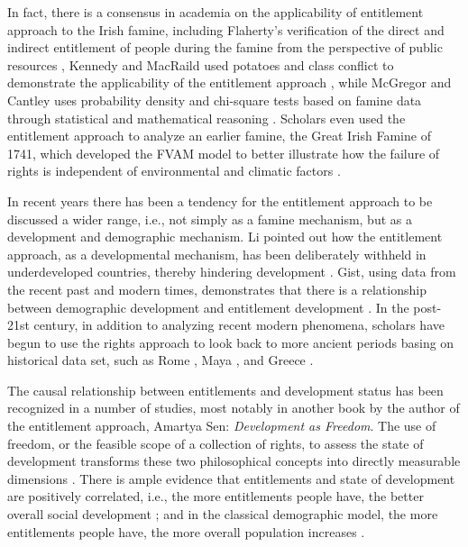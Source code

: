 In fact, there is a consensus in academia on the applicability of entitlement approach to the Irish famine, including Flaherty's verification of the direct and indirect entitlement of  people during the famine from the perspective of public resources \citep{flaherty2021common}, Kennedy and MacRaild used potatoes and class conflict to demonstrate the applicability of the entitlement approach \citep{kennedy2022perspectives}, while McGregor and Cantley uses probability density and chi-square tests based on famine data through statistical and mathematical reasoning \citep{mcgregor1992test}. Scholars even used the entitlement approach to analyze an earlier famine, the Great Irish Famine of 1741, which developed the FVAM model to better illustrate how the failure of rights is independent of environmental and climatic factors \citep{engler2013irish}. 

In recent years there has been a tendency for the entitlement approach to be discussed a wider range, i.e., not simply as a famine mechanism, but as a development and demographic mechanism. Li pointed out how the entitlement approach, as a developmental mechanism, has been deliberately withheld in underdeveloped countries, thereby hindering development \citep{li2017after}. Gist, using data from the recent past and modern times, demonstrates that there is a relationship between demographic development and entitlement development \citep{gist2008population}. In the post-21st century, in addition to analyzing recent modern phenomena, scholars have begun to use the rights approach to look back to more ancient periods basing on historical data set, such as Rome \citep{jongman2006rise}, Maya \citep{barrett2004constructing}, and Greece \citep{gray2011exile}.

The causal relationship between entitlements and development status has been recognized in a number of studies, most notably in another book by the author of the entitlement approach, Amartya Sen: \textit{Development as Freedom}. The use of freedom, or the feasible scope of a collection of rights, to assess the state of development transforms these two philosophical concepts into directly measurable dimensions \citep{sen2014development}. There is ample evidence that entitlements and state of development are positively correlated, i.e., the more entitlements people have, the better overall social development \citep{chauffour2011relevance}; and in the classical demographic model, the more entitlements people have, the more overall population increases \citep{zemojtel2015measurement}.

